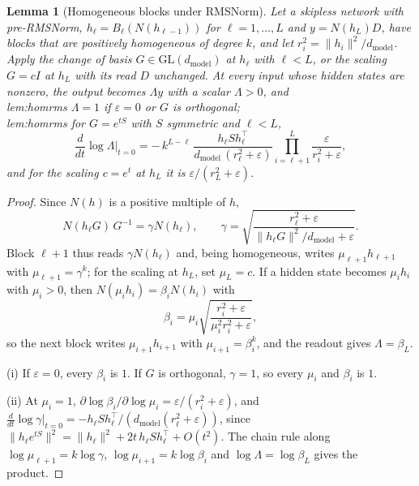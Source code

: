 \documentclass[10pt]{article}
\newtheorem{lemma}[theorem]{Lemma}
\theoremstyle{definition}
\theoremstyle{remark}
\newcommand{\dm}{d_{\mathrm{model}}}
\newcommand{\GL}{\mathrm{GL}}
\newcommand{\norm}[1]{\lVert #1\rVert}
\newcommand{\ptlabel}[1]{\phantomsection\label{#1}}
\newcommand{\stpart}[3]{\ifx\relax#1\relax\else\ptlabel{#1:#2}\fi{\upshape\bfseries\boldmath(#2)\ifx\relax#3\relax\else\ #3.\fi}}
\begin{document}
\begin{lemma}[Homogeneous blocks under RMSNorm]\label{lem:homrms}
Let a skipless network with pre-RMSNorm, $h_\ell = B_\ell(N(h_{\ell-1}))$ for $\ell = 1, \dots, L$ and $y = N(h_L)D$, have blocks that are positively homogeneous of degree $k$, and let $r_i^2 = \norm{h_i}^2/\dm$. Apply the change of basis $G \in \GL(\dm)$ at $h_\ell$ with $\ell < L$, or the scaling $G = cI$ at $h_L$ with its read $D$ unchanged. At every input whose hidden states are nonzero, the output becomes $\Lambda y$ with a scalar $\Lambda > 0$, and\\
\stpart{lem:homrms}{i}{} $\Lambda = 1$ if $\varepsilon = 0$ or $G$ is orthogonal;\\
\stpart{lem:homrms}{ii}{} for $G = e^{tS}$ with $S$ symmetric and $\ell < L$,
\[
\frac{d}{dt}\log\Lambda\Big|_{t=0} = -\,k^{L-\ell}\,\frac{h_\ell S h_\ell^\top}{\dm\,(r_\ell^2+\varepsilon)}\prod_{i=\ell+1}^{L}\frac{\varepsilon}{r_i^2+\varepsilon},
\]
and for the scaling $c = e^t$ at $h_L$ it is $\varepsilon/(r_L^2+\varepsilon)$.
\end{lemma}
\begin{proof}
Since $N(h)$ is a positive multiple of $h$,
\[
N(h_\ell G)\,G^{-1} = \gamma N(h_\ell), \qquad \gamma = \sqrt{\frac{r_\ell^2+\varepsilon}{\norm{h_\ell G}^2/\dm+\varepsilon}}.
\]
Block $\ell+1$ thus reads $\gamma N(h_\ell)$ and, being homogeneous, writes $\mu_{\ell+1}h_{\ell+1}$ with $\mu_{\ell+1} = \gamma^k$; for the scaling at $h_L$, set $\mu_L = c$. If a hidden state becomes $\mu_i h_i$ with $\mu_i > 0$, then $N(\mu_i h_i) = \beta_i N(h_i)$ with
\[
\beta_i = \mu_i\sqrt{\frac{r_i^2+\varepsilon}{\mu_i^2 r_i^2+\varepsilon}},
\]
so the next block writes $\mu_{i+1}h_{i+1}$ with $\mu_{i+1} = \beta_i^k$, and the readout gives $\Lambda = \beta_L$.

(i) If $\varepsilon = 0$, every $\beta_i$ is $1$. If $G$ is orthogonal, $\gamma = 1$, so every $\mu_i$ and $\beta_i$ is $1$.

(ii) At $\mu_i = 1$, $\partial\log\beta_i/\partial\log\mu_i = \varepsilon/(r_i^2+\varepsilon)$, and $\frac{d}{dt}\log\gamma\big|_{t=0} = -h_\ell S h_\ell^\top/(\dm(r_\ell^2+\varepsilon))$, since $\norm{h_\ell e^{tS}}^2 = \norm{h_\ell}^2 + 2t\,h_\ell S h_\ell^\top + O(t^2)$. The chain rule along $\log\mu_{\ell+1} = k\log\gamma$, $\log\mu_{i+1} = k\log\beta_i$ and $\log\Lambda = \log\beta_L$ gives the product.
\end{proof}
\end{document}
